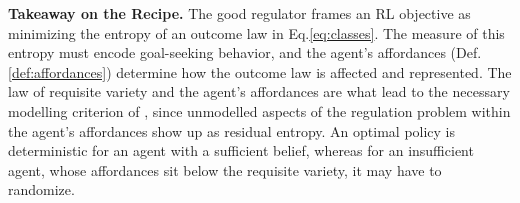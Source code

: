 \begin{tcolorbox}[colback=gray!4, colframe=gray!60, boxrule=0.5pt, arc=2pt, left=6pt, right=6pt, top=4pt, bottom=4pt]
\small
\textbf{Takeaway on the Recipe.}
The good regulator frames an RL objective as minimizing the entropy of an outcome law in Eq.\eqref{eq:classes}.
The measure of this entropy must encode goal-seeking behavior, and the agent's affordances (Def.\ref{def:affordances}) determine how the outcome law is affected and represented.
The law of requisite variety and the agent's affordances are what lead to the necessary modelling criterion of \citet{Conant-good70}, since unmodelled aspects of the regulation problem within the agent's affordances show up as residual entropy.
An optimal policy is deterministic for an agent with a sufficient belief, whereas for an insufficient agent, whose affordances sit below the requisite variety, it may have to randomize.
\end{tcolorbox}



